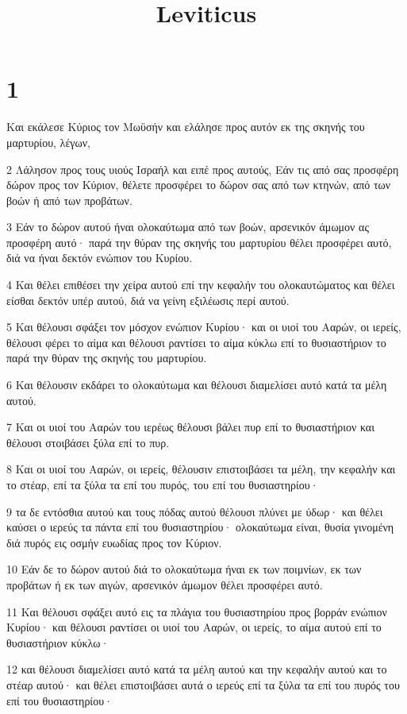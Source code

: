 

\title{Leviticus}


\chapter{1}

\par Και εκάλεσε Κύριος τον Μωϋσήν και ελάλησε προς αυτόν εκ της σκηνής του μαρτυρίου, λέγων,
\par 2 Λάλησον προς τους υιούς Ισραήλ και ειπέ προς αυτούς, Εάν τις από σας προσφέρη δώρον προς τον Κύριον, θέλετε προσφέρει το δώρον σας από των κτηνών, από των βοών ή από των προβάτων.
\par 3 Εάν το δώρον αυτού ήναι ολοκαύτωμα από των βοών, αρσενικόν άμωμον ας προσφέρη αυτό· παρά την θύραν της σκηνής του μαρτυρίου θέλει προσφέρει αυτό, διά να ήναι δεκτόν ενώπιον του Κυρίου.
\par 4 Και θέλει επιθέσει την χείρα αυτού επί την κεφαλήν του ολοκαυτώματος και θέλει είσθαι δεκτόν υπέρ αυτού, διά να γείνη εξιλέωσις περί αυτού.
\par 5 Και θέλουσι σφάξει τον μόσχον ενώπιον Κυρίου· και οι υιοί του Ααρών, οι ιερείς, θέλουσι φέρει το αίμα και θέλουσι ραντίσει το αίμα κύκλω επί το θυσιαστήριον το παρά την θύραν της σκηνής του μαρτυρίου.
\par 6 Και θέλουσιν εκδάρει το ολοκαύτωμα και θέλουσι διαμελίσει αυτό κατά τα μέλη αυτού.
\par 7 Και οι υιοί του Ααρών του ιερέως θέλουσι βάλει πυρ επί το θυσιαστήριον και θέλουσι στοιβάσει ξύλα επί το πυρ.
\par 8 Και οι υιοί του Ααρών, οι ιερείς, θέλουσιν επιστοιβάσει τα μέλη, την κεφαλήν και το στέαρ, επί τα ξύλα τα επί του πυρός, του επί του θυσιαστηρίου·
\par 9 τα δε εντόσθια αυτού και τους πόδας αυτού θέλουσι πλύνει με ύδωρ· και θέλει καύσει ο ιερεύς τα πάντα επί του θυσιαστηρίου· ολοκαύτωμα είναι, θυσία γινομένη διά πυρός εις οσμήν ευωδίας προς τον Κύριον.
\par 10 Εάν δε το δώρον αυτού διά το ολοκαύτωμα ήναι εκ των ποιμνίων, εκ των προβάτων ή εκ των αιγών, αρσενικόν άμωμον θέλει προσφέρει αυτό.
\par 11 Και θέλουσι σφάξει αυτό εις τα πλάγια του θυσιαστηρίου προς βορράν ενώπιον Κυρίου· και θέλουσι ραντίσει οι υιοί του Ααρών, οι ιερείς, το αίμα αυτού επί το θυσιαστήριον κύκλω·
\par 12 και θέλουσι διαμελίσει αυτό κατά τα μέλη αυτού και την κεφαλήν αυτού και το στέαρ αυτού· και θέλει επιστοιβάσει αυτά ο ιερεύς επί τα ξύλα τα επί του πυρός του επί του θυσιαστηρίου·
